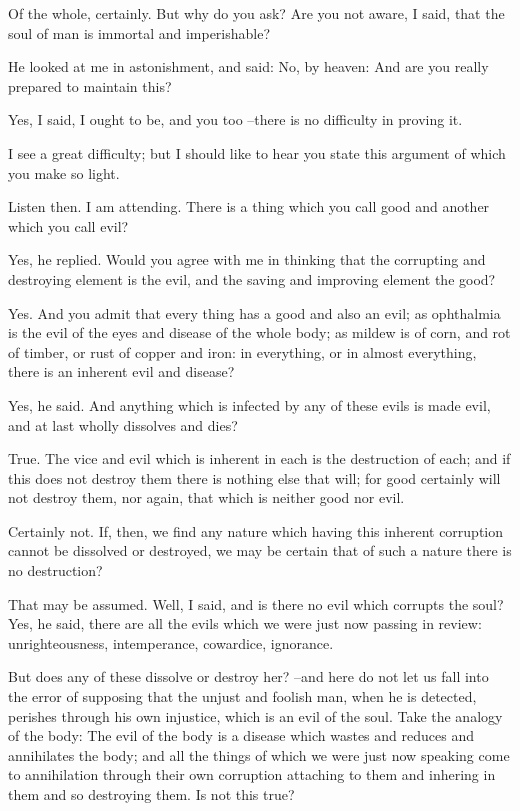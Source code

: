 Of the whole, certainly. But why do you ask?
Are you not aware, I said, that the soul of man is immortal and imperishable?

He looked at me in astonishment, and said: No, by heaven: And are you really prepared to maintain this?

Yes, I said, I ought to be, and you too --there is no difficulty in proving it.

I see a great difficulty; but I should like to hear you state this argument of which you make so light.

Listen then.
I am attending.
There is a thing which you call good and another which you call evil?

Yes, he replied.
Would you agree with me in thinking that the corrupting and destroying element is the evil, and the saving and improving element the good?

Yes.
And you admit that every thing has a good and also an evil; as ophthalmia is the evil of the eyes and disease of the whole body; as mildew is of corn, and rot of timber, or rust of copper and iron: in everything, or in almost everything, there is an inherent evil and disease?

Yes, he said.
And anything which is infected by any of these evils is made evil, and at last wholly dissolves and dies?

True.
The vice and evil which is inherent in each is the destruction of each; and if this does not destroy them there is nothing else that will; for good certainly will not destroy them, nor again, that which is neither good nor evil.

Certainly not.
If, then, we find any nature which having this inherent corruption cannot be dissolved or destroyed, we may be certain that of such a nature there is no destruction?

That may be assumed.
Well, I said, and is there no evil which corrupts the soul?
Yes, he said, there are all the evils which we were just now passing in review: unrighteousness, intemperance, cowardice, ignorance.

But does any of these dissolve or destroy her? --and here do not let us fall into the error of supposing that the unjust and foolish man, when he is detected, perishes through his own injustice, which is an evil of the soul. Take the analogy of the body: The evil of the body is a disease which wastes and reduces and annihilates the body; and all the things of which we were just now speaking come to annihilation through their own corruption attaching to them and inhering in them and so destroying them. Is not this true?

